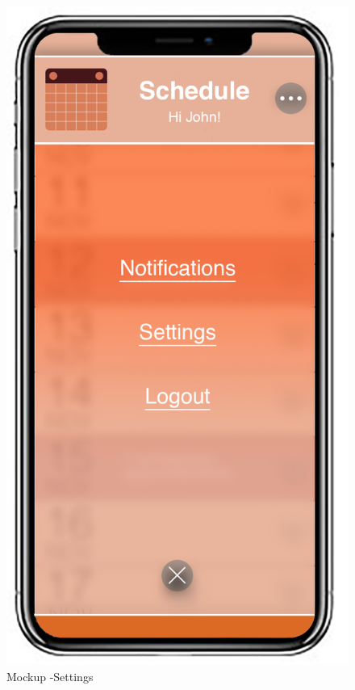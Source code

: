 \begin{figure}[H]	
	\centerline{\includegraphics[width=0.3\paperwidth]{Images/Settings}}
	\caption{Mockup -Settings}
\end{figure}	
